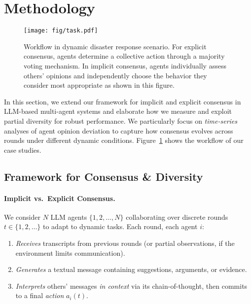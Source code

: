 \section{Methodology}
\label{sec:methodology}

\begin{figure}
    \centering
    \texttt{[image: fig/task.pdf]}
    \vspace{-1.5em}
    \caption{Workflow in dynamic disaster response scenario. For explicit consensus, agents determine a collective action through a majority voting mechanism. In implicit consensus, agents individually assess others' opinions and independently choose the behavior they consider most appropriate as shown in this figure.}
    \vspace{-1.5em}
    \label{fig:workflow}
\end{figure}

In this section, we extend our framework for implicit and explicit consensus in LLM-based multi-agent systems and elaborate how we measure and exploit partial diversity for robust performance. We particularly focus on \emph{time-series} analyses of agent opinion deviation to capture how consensus evolves across rounds under different dynamic conditions. Figure~\ref{fig:workflow} shows the workflow of our case studies.

\subsection{Framework for Consensus \& Diversity}
\paragraph{Implicit vs.\ Explicit Consensus.}
We consider $N$ LLM agents $\{1, 2, \dots, N\}$ collaborating over discrete rounds $t \in \{1,2,\ldots\}$ to adapt to dynamic tasks. Each round, each agent $i$:
\begin{enumerate}[itemsep=1pt, parsep=1pt, leftmargin=*]
    \item \emph{Receives} transcripts from previous rounds (or partial observations, if the environment limits communication).
    \item \emph{Generates} a textual message containing suggestions, arguments, or evidence.
    \item \emph{Interprets} others' messages \emph{in context} via its chain-of-thought, then commits to a final \emph{action} $a_i(t)$.
\end{enumerate}

